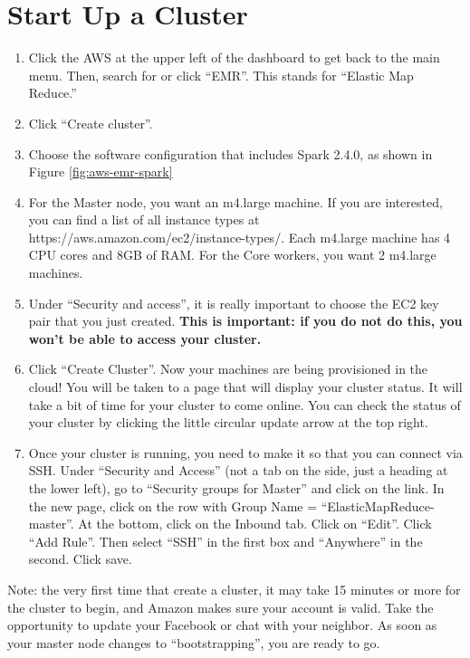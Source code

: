 \documentclass[11pt]{article}
\renewcommand\:{\colon} %
\begin{document}
\section{Start Up a Cluster}

\begin{enumerate}
  \item Click the AWS at the upper left of the dashboard to get back to the
    main menu. Then, search for or click ``EMR''. This stands for ``Elastic Map
    Reduce.''
  \item Click ``Create cluster''.
  \item Choose the software configuration that includes Spark 2.4.0, as shown
    in Figure \ref{fig:aws-emr-spark}
  \item For the Master node, you want an m4.large machine. If you are
    interested, you can find a list of all instance types at
    https://aws.amazon.com/ec2/instance-types/.  Each m4.large machine has 4
    CPU cores and 8GB of RAM. For the Core workers, you want 2 m4.large
    machines.
  \item Under ``Security and access'', it is really important to choose the EC2
    key pair that you just created. \textbf{ This is important: if you do not
      do this, you won’t be able to access your cluster.}
  \item Click ``Create Cluster''. Now your machines are being provisioned in
    the cloud! You will be taken to a page that will display your cluster
    status. It will take a bit of time for your cluster to come online. You can
    check the status of your cluster by clicking the little circular update
    arrow at the top right.
   \item  Once your cluster is running, you need to make it so that you can connect via SSH. Under ``Security and Access'' (not a tab on the side, just a heading at the lower left), go to ``Security groups for Master'' and click on the link. In the new page, click on the row with Group Name = ``ElasticMapReduce-master''. At the bottom, click on the Inbound tab. Click on ``Edit''. Click ``Add Rule''. Then select ``SSH'' in the first box and ``Anywhere'' in the second. Click save.

\end{enumerate}

Note: the very first time that create a cluster, it may take 15 minutes or
more for the cluster to begin, and Amazon makes sure your account is valid.
Take the opportunity to update your Facebook or chat with your neighbor. As
soon as your master node changes to ``bootstrapping'', you are ready to go.
\end{document}
